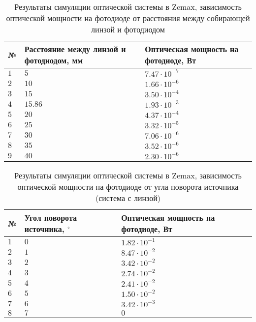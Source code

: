 \begin{table}
    \caption{Результаты симуляции оптической системы в Zemax, зависимость оптической мощности на фотодиоде от расстояния между собирающей линзой и фотодиодом}
    \label{tab:lens_simulation}
    \begin{tabularx}{\textwidth} {
        | l
        | >{\centering\arraybackslash}X
        | >{\centering\arraybackslash}X | }
        \hline
            № & Расстояние между линзой и фотодиодом, мм & Оптическая мощность на фотодиоде, Вт \\ \hline
            $1$ & $5$ & $7.47 \cdot 10^{-7}$ \\ \hline
            $2$ & $10$ & $1.66 \cdot 10^{-6}$ \\ \hline
            $3$ & $15$ & $3.50 \cdot 10^{-4}$ \\ \hline
            $4$ & $15.86$ & $1.93 \cdot 10^{-3}$ \\ \hline
            $5$ & $20$ & $4.37 \cdot 10^{-4}$ \\ \hline
            $6$ & $25$ & $3.32 \cdot 10^{-5}$ \\ \hline
            $7$ & $30$ & $7.06 \cdot 10^{-6}$ \\ \hline
            $8$ & $35$ & $3.52 \cdot 10^{-6}$ \\ \hline
            $9$ & $40$ & $2.30 \cdot 10^{-6}$ \\ \hline           
    \end{tabularx}
\end{table}

\begin{table}
    \caption{Результаты симуляции оптической системы в Zemax, зависимость оптической мощности на фотодиоде от угла поворота источника (система с линзой)}
    \label{tab:spinner_with_lens}
    \begin{tabularx}{\textwidth} {
        | l
        | >{\centering\arraybackslash}X
        | >{\centering\arraybackslash}X | }
        \hline
            № & Угол поворота источника, ${}^\circ$ & Оптическая мощность на фотодиоде, Вт \\ \hline
            $1$ & $0$ & $1.82 \cdot 10^{-1}$ \\ \hline
            $2$ & $1$ & $8.47 \cdot 10^{-2}$ \\ \hline
            $3$ & $2$ & $3.42 \cdot 10^{-2}$ \\ \hline
            $4$ & $3$ & $2.74 \cdot 10^{-2}$ \\ \hline
            $5$ & $4$ & $2.41 \cdot 10^{-2}$ \\ \hline
            $6$ & $5$ & $1.50 \cdot 10^{-2}$ \\ \hline
            $7$ & $6$ & $3.42 \cdot 10^{-3}$ \\ \hline
            $8$ & $7$ & $0$ \\ \hline
    \end{tabularx}
\end{table}

